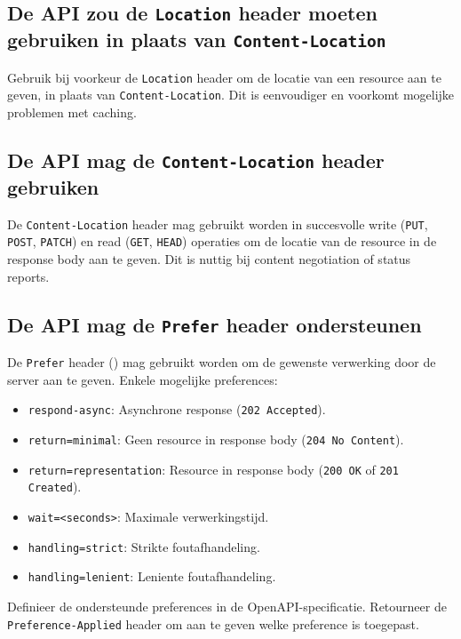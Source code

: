 \subsection{De API zou de \texttt{Location} header moeten gebruiken in plaats van \texttt{Content-Location}}
\label{subsection:location_header}

Gebruik bij voorkeur de \texttt{Location} header om de locatie van een resource aan te geven, in plaats van \texttt{Content-Location}. Dit is eenvoudiger en voorkomt mogelijke problemen met caching.

\subsection{De API mag de \texttt{Content-Location} header gebruiken}
\label{subsection:content_location}

De \texttt{Content-Location} header mag gebruikt worden in succesvolle write (\texttt{PUT}, \texttt{POST}, \texttt{PATCH}) en read (\texttt{GET}, \texttt{HEAD}) operaties om de locatie van de resource in de response body aan te geven. Dit is nuttig bij content negotiation of status reports.

\subsection{De API mag de \texttt{Prefer} header ondersteunen}
\label{subsection:prefer_header}

De \texttt{Prefer} header (\autocite{rfc7240}) mag gebruikt worden om de gewenste verwerking door de server aan te geven. Enkele mogelijke preferences:

\begin{itemize}
    \item \texttt{respond-async}: Asynchrone response (\texttt{202 Accepted}).
    \item \texttt{return=minimal}: Geen resource in response body (\texttt{204 No Content}).
    \item \texttt{return=representation}: Resource in response body (\texttt{200 OK} of \texttt{201 Created}).
    \item \texttt{wait=<seconds>}: Maximale verwerkingstijd.
    \item \texttt{handling=strict}: Strikte foutafhandeling.
    \item \texttt{handling=lenient}: Leniente foutafhandeling.
\end{itemize}

Definieer de ondersteunde preferences in de OpenAPI-specificatie. Retourneer de \texttt{Preference-Applied} header om aan te geven welke preference is toegepast.

